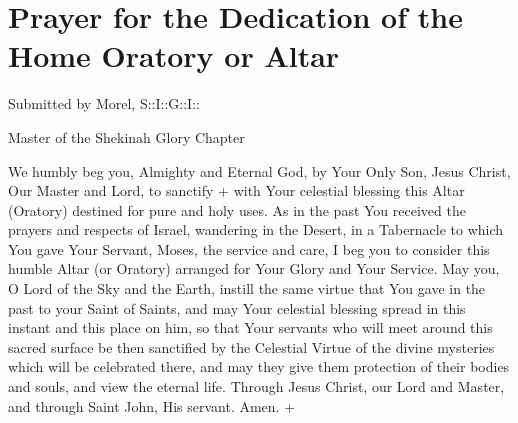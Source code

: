 \section{Prayer for the Dedication of the Home Oratory or Altar}

Submitted by Morel, S::I::G::I::

Master of the Shekinah Glory Chapter

We humbly beg you, Almighty and Eternal God, by Your Only Son, Jesus Christ, Our Master and
Lord, to sanctify + with Your celestial blessing this Altar (Oratory) destined for pure and holy uses.
As in the past You received the prayers and respects of Israel, wandering in the Desert, in a
Tabernacle to which You gave Your Servant, Moses, the service and care, I beg you to consider
this humble Altar (or Oratory) arranged for Your Glory and Your Service. May you, O Lord of the
Sky and the Earth, instill the same virtue that You gave in the past to your Saint of Saints, and
may Your celestial blessing spread in this instant and this place on him, so that Your servants who
will meet around this sacred surface be then sanctified by the Celestial Virtue of the divine
mysteries which will be celebrated there, and may they give them protection of their bodies and
souls, and view the eternal life. Through Jesus Christ, our Lord and Master, and through Saint
John, His servant. Amen. +